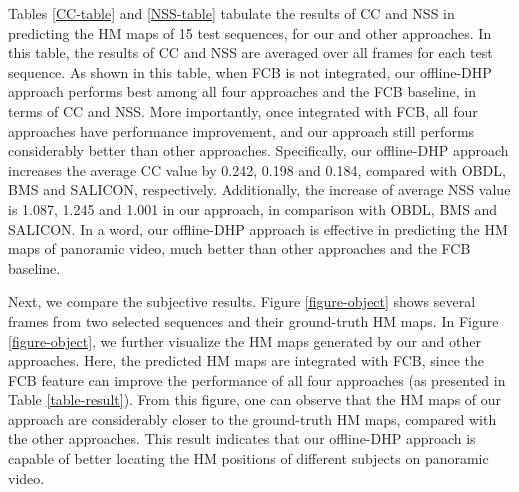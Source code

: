\documentclass[10pt,journal,compsoc]{IEEEtran}
\begin{document}
Tables \ref{CC-table} and \ref{NSS-table} tabulate the results of CC and NSS in predicting the HM maps of 15 test sequences, for our and other approaches.
In this table, the results of CC and NSS are averaged over all frames for each test sequence.
As shown in this table, when FCB is not integrated, our offline-DHP approach performs best among all four approaches and the FCB baseline, in terms of CC and NSS.
More importantly, once integrated with FCB, all four approaches have performance improvement, and our approach still performs considerably better than other approaches.
Specifically, our offline-DHP approach increases the average CC value by 0.242, 0.198 and 0.184, compared with OBDL, BMS and SALICON, respectively.
Additionally, the increase of average NSS value is 1.087, 1.245 and 1.001 in our approach, in comparison with OBDL, BMS and SALICON.
In a word, our offline-DHP approach is effective in predicting the HM maps of panoramic video, much better than other approaches and the FCB baseline.




Next, we compare the subjective results. Figure \ref{figure-object} shows several frames from two selected sequences and their ground-truth HM maps.
In Figure \ref{figure-object}, we further visualize the HM maps generated by our and other approaches. Here, the predicted HM maps are integrated with FCB, since the FCB feature can improve the performance of all four approaches (as presented in Table \ref{table-result}).
From this figure, one can observe that the HM maps of our approach are considerably closer to the ground-truth HM maps, compared with the other approaches.
This result indicates that our offline-DHP approach is capable of better locating the HM positions of different subjects on panoramic video.
\end{document}
